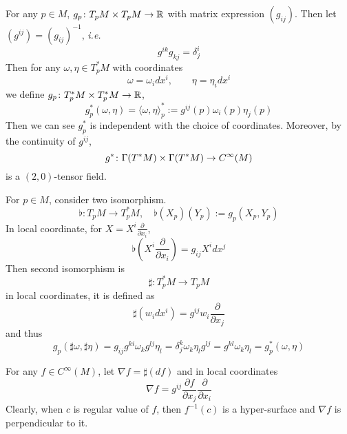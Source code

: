 \begin{enumerate}[label=\arabic{*}.]
	\noindent For any $p \in M$, $g_p \colon T_pM \times T_pM \rightarrow \mathbb{R}$ with matrix expression $(g_{ij})$. Then let $(g^{ij}) = (g_{ij})^{-1}$, \emph{i.e.}
	\begin{equation*}
		g^{ik}g_{kj} = \delta^i_j
	\end{equation*}
	Then for any $\omega,\eta \in T_p^*M$ with coordinates
	\begin{equation*}
		\omega=\omega_i d x^i, \quad \quad \eta=\eta_i d x^i
	\end{equation*}
	we define $g_p \colon T_p^*M \times T_p^*M \rightarrow \mathbb{R}$,
	\begin{equation*}
		g_p^*(\omega, \eta)=\langle\omega, \eta\rangle_p^*:=g^{i j}(p) \omega_i(p) \eta_j(p)
	\end{equation*}
	Then we can see $g^*_p$ is independent with the choice of coordinates. Moreover, by the continuity of $g^{ij}$,
	\begin{equation*}
		g^* \colon \Gamma(T^*M) \times \Gamma(T^*M) \rightarrow C^\infty(M)
	\end{equation*}
	is a $(2,0)$-tensor field.

	\noindent For $p \in M$, consider two isomorphism.
	\begin{equation*}
		\flat: T_p M \rightarrow T_p^* M, \quad \flat\left(X_p\right)\left(Y_p\right):=g_p\left(X_p, Y_p\right)
	\end{equation*}
	In local coordinate, for $X = X^i\frac{\partial}{\partial x_i}$,
	\begin{equation*}
		\flat(X^i\frac{\partial}{\partial x_i}) = g_{i j} X^i d x^j
	\end{equation*}
	Then second isomorphism is
	\begin{equation*}
		\sharp: T_p^* M \rightarrow T_p M
	\end{equation*}
	in local coordinates, it is defined as
	\begin{equation*}
		\sharp\left(w_i d x^i\right)=g^{i j} w_i \frac{\partial}{\partial x_j}
	\end{equation*}
	and thus
	\begin{equation*}
		g_p(\sharp \omega, \sharp \eta)=g_{i j} g^{k i} \omega_k g^{l j} \eta_l=\delta_j^k \omega_k \eta_l g^{l j}=g^{k l} \omega_k \eta_l = g_p^*(\omega, \eta)
	\end{equation*}

	\noindent For any $f \in C^\infty(M)$, let $\nabla f = \sharp(df)$ and in local coordinates
	\begin{equation*}
		\nabla f = g^{ij}\frac{\partial f}{\partial x_j}\frac{\partial}{\partial x_i}
	\end{equation*}
	Clearly, when $c$ is regular value of $f$, then $f^{-1}(c)$ is a hyper-surface and $\nabla f$ is perpendicular to it.


\end{enumerate}
